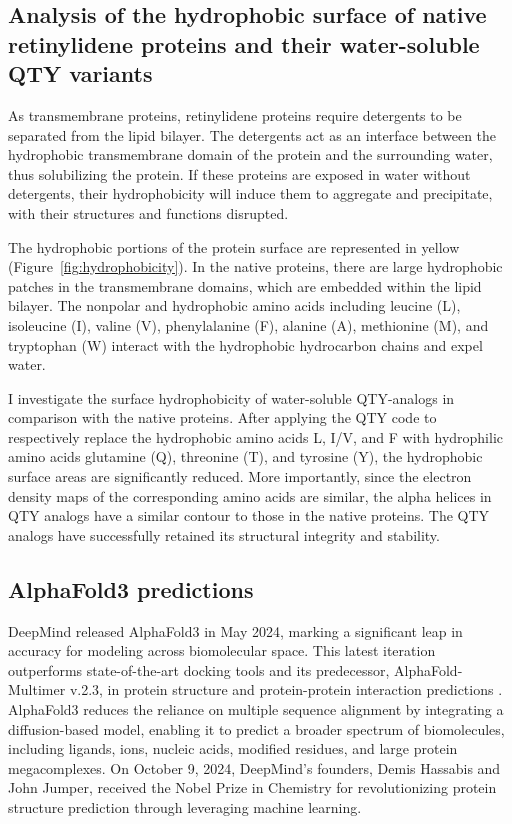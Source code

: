 \documentclass[fleqn, 10pt]{manuscript}
\begin{document}
\subsection*{Analysis of the hydrophobic surface of native retinylidene proteins and their water-soluble QTY variants}

As transmembrane proteins, retinylidene proteins require detergents to be separated from the lipid bilayer. The detergents act as an interface between the hydrophobic transmembrane domain of the protein and the surrounding water, thus solubilizing the protein. If these proteins are exposed in water without detergents, their hydrophobicity will induce them to aggregate and precipitate, with their structures and functions disrupted. 

The hydrophobic portions of the protein surface are represented in yellow (Figure~\ref{fig:hydrophobicity}). In the native proteins, there are large hydrophobic patches in the transmembrane domains, which are embedded within the lipid bilayer. The nonpolar and hydrophobic amino acids including leucine (L), isoleucine (I), valine (V), phenylalanine (F), alanine (A), methionine (M), and tryptophan (W) interact with the hydrophobic hydrocarbon chains and expel water. 

I investigate the surface hydrophobicity of water-soluble QTY-analogs in comparison with the native proteins. After applying the QTY code to respectively replace the hydrophobic amino acids L, I/V, and F with hydrophilic amino acids glutamine (Q), threonine (T), and tyrosine (Y), the hydrophobic surface areas are significantly reduced. More importantly, since the electron density maps of the corresponding amino acids are similar, the alpha helices in QTY analogs have a similar contour to those in the native proteins. The QTY analogs have successfully retained its structural integrity and stability. 

\subsection*{AlphaFold3 predictions}

DeepMind released AlphaFold3 in May 2024, marking a significant leap in accuracy for modeling across biomolecular space. This latest iteration outperforms state-of-the-art docking tools and its predecessor, AlphaFold-Multimer v.2.3, in protein structure and protein-protein interaction predictions \citep{Abramson_2024}. AlphaFold3 reduces the reliance on multiple sequence alignment by integrating a diffusion-based model, enabling it to predict a broader spectrum of biomolecules, including ligands, ions, nucleic acids, modified residues, and large protein megacomplexes. On October 9, 2024, DeepMind’s founders, Demis Hassabis and John Jumper, received the Nobel Prize in Chemistry for revolutionizing protein structure prediction through leveraging machine learning. 
\end{document}
